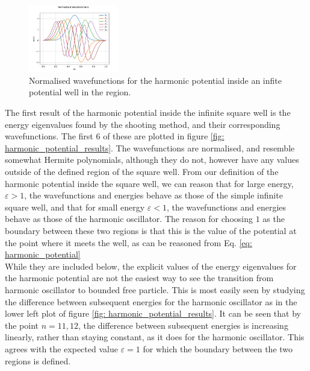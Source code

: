 \documentclass[10pt,a4paper]{article}
\theoremstyle{definition}
\theoremstyle{remark}
\begin{document}
\begin{figure}
    \centering
    \includegraphics[width=0.35\textwidth]{Normalised Wavefunctions_harmonic_nu.pdf}
    \caption{\label{fig: harmonic_potential_wavefunctions}Normalised wavefunctions for the harmonic potential inside an infite potential well in the region.}
    
\end{figure}
The first result of the harmonic potential inside the infinite square well is the energy eigenvalues found by the shooting method, and their corresponding wavefunctions. The first 6 of these are plotted in figure \ref{fig: harmonic_potential_results}. The wavefunctions are normalised, and resemble somewhat Hermite polynomials, although they do not, however have any values outside of the defined region of the square well. From our definition of the harmonic potential inside the square well, we can reason that for large energy, $\varepsilon > 1$, the wavefunctions and energies behave as those of the simple infinite square well, and that for small energy $\varepsilon < 1$, the wavefunctions and energies behave as those of the harmonic oscillator. The reason for choosing $1$ as the boundary between these two regions is that this is the value of the potential at the point where it meets the well, as can be reasoned from Eq. \ref{eq: harmonic_potential}\\
\indent While they are included below, the explicit values of the energy eigenvalues for the harmonic potential are not the easiest way to see the transition from harmonic oscillator to bounded free particle. This is most easily seen by studying the difference between subsequent energies for the harmonic oscillator as in the lower left plot of figure \ref{fig: harmonic_potential_results}. It can be seen that by the point $n=11,12$, the difference between subsequent energies is increasing linearly, rather than staying constant, as it does for the harmonic oscillator. This agrees with the expected value $\varepsilon = 1$ for which the boundary between the two regions is defined.\\
\end{document}
